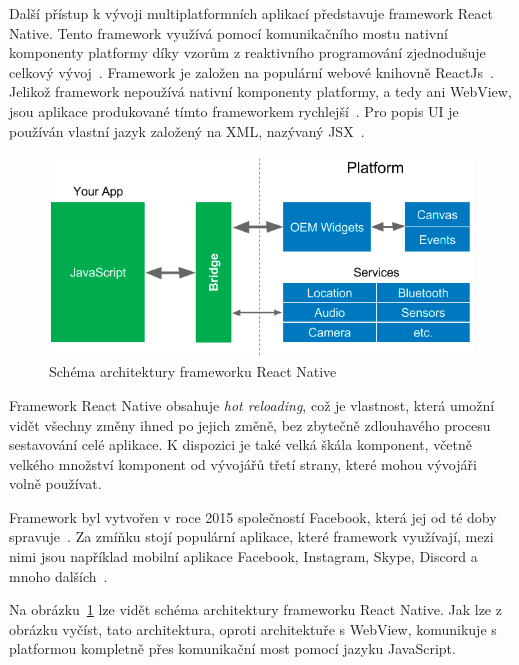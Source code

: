 Další přístup k vývoji multiplatformních aplikací představuje framework
React Native.
Tento framework využívá pomocí komunikačního mostu nativní komponenty platformy
díky vzorům z reaktivního programování zjednodušuje celkový
vývoj~\cite{hackernoon_flutter}.
Framework je založen na populární webové
knihovně ReactJs~\cite{dashmagazine_mobile_frameworks}.
Jelikož framework nepoužívá nativní komponenty platformy,
a tedy ani WebView,
jsou aplikace produkované tímto frameworkem
rychlejší~\cite{dashmagazine_mobile_frameworks}.
Pro popis UI je používán vlastní jazyk založený na XML,
nazývaný JSX~\cite{dashmagazine_mobile_frameworks}.

\begin{figure}[ht!]
    \centering
    \includegraphics[width=\linewidth]{assets/technology-research/framework/react_native.png}
    \caption{Schéma architektury frameworku React Native
    ~\cite{hackernoon_flutter}}
    \label{fig:framework_react_native}
\end{figure}

Framework React Native obsahuje \emph{hot reloading},
což je vlastnost,
která umožní vidět všechny změny ihned po jejich změně,
bez zbytečně zdlouhavého procesu sestavování celé aplikace.
K dispozici je také velká škála komponent,
včetně velkého množství komponent od vývojářů třetí strany, 
které mohou vývojáři volně používat.~\cite{dashmagazine_mobile_frameworks}

Framework byl vytvořen v roce 2015
společností Facebook,
která jej od té doby spravuje~\cite{hackernoon_flutter}.
Za zmíňku stojí populární aplikace,
které framework využívají,
mezi nimi jsou například mobilní aplikace Facebook, Instagram, Skype, Discord
a mnoho dalších~\cite{react_native}.

Na obrázku~\ref{fig:framework_react_native} lze vidět schéma architektury
frameworku React Native.
Jak lze z obrázku vyčíst,
tato architektura,
oproti architektuře s WebView,
komunikuje s platformou kompletně přes komunikační most pomocí jazyku
JavaScript.

